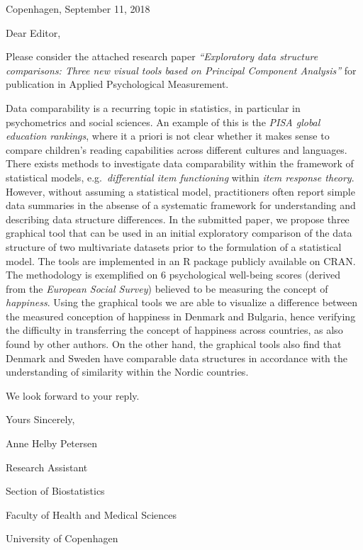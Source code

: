 \documentclass[12pt,a4paper]{article}
\begin{document}
\begin{flushright}
Copenhagen, September 11, 2018
\end{flushright}

\bigskip

Dear Editor,

\medskip

Please consider the attached research paper \emph{``Exploratory data structure comparisons: Three new visual tools based on Principal Component Analysis''} for publication in Applied Psychological Measurement.

\medskip

Data comparability is a recurring topic in statistics, in particular in psychometrics and social sciences. An example of this is the \emph{PISA global education rankings}, where  it a priori is not clear whether it makes sense to compare children's reading capabilities across different cultures and languages. There exists methods to investigate data comparability within the framework of statistical models, e.g.\ \emph{differential item functioning} within \emph{item response theory}. However, without assuming a statistical model, practitioners often report simple data summaries in the absense of a systematic framework for understanding and describing data structure differences. In the submitted paper, we propose three graphical tool that can be used in an initial exploratory comparison of the data structure of two multivariate datasets prior to the formulation of a statistical model. The tools are implemented in an R package publicly available on CRAN. The methodology is exemplified on 6 psychological well-being scores (derived from the \emph{European Social Survey}) believed to be measuring the concept of \emph{happiness}. Using the graphical tools we are able to visualize a difference between the measured conception of happiness in Denmark and Bulgaria, hence verifying the difficulty in transferring the concept of happiness across countries, as also found by other authors. On the other hand, the graphical tools also find that Denmark and Sweden have comparable data structures in accordance with the understanding of similarity within the Nordic countries.

\medskip

We look forward to your reply.

\bigskip

Yours Sincerely,

\bigskip\bigskip

Anne Helby Petersen

Research Assistant

Section of Biostatistics

Faculty of Health and Medical Sciences

University of Copenhagen
\end{document}
